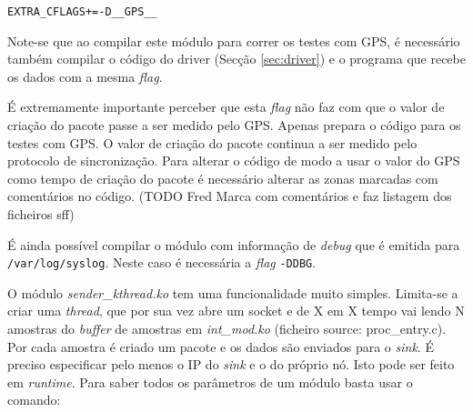 \documentclass[10pt,a4paper,oneside]{book}
\begin{document}
    \begin{center}
      {\tt EXTRA\_CFLAGS+=-D\_\_GPS\_\_}
    \end{center}

    Note-se que ao compilar este módulo para correr os testes com GPS, é necessário também compilar o código do driver (Secção \ref{sec:driver}) e o programa que recebe os dados com a mesma \emph{flag}.

    É extremamente importante perceber que esta \emph{flag} não faz com que o valor de criação do pacote passe a ser medido pelo GPS. Apenas prepara o código para os testes com GPS. O valor de criação do pacote continua a ser medido pelo protocolo de sincronização. Para alterar o código de modo a usar o valor do GPS como tempo de criação do pacote é necessário alterar as zonas marcadas com comentários no código.
    (TODO Fred Marca com comentários e faz listagem dos ficheiros sff)

    É ainda possível compilar o módulo com informação de \emph{debug} que é emitida para {\tt /var/log/syslog}. Neste caso é necessária a \emph{flag} {\tt -DDBG}.

    O módulo \emph{sender\_kthread.ko} tem uma funcionalidade muito simples. Limita-se a criar uma \emph{thread}, que por sua vez abre um socket e de X em X tempo vai lendo N amostras do \emph{buffer} de amostras em \emph{int\_mod.ko} (ficheiro source: proc\_entry.c). Por cada amostra é criado um pacote e os dados são enviados para o \emph{sink}. É preciso especificar pelo menos o IP do \emph{sink} e o do próprio nó. Isto pode ser feito em \emph{runtime}. Para saber todos os parâmetros de um módulo basta usar o comando:
\end{document}
